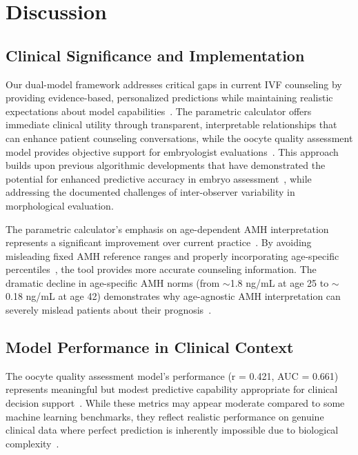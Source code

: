 \section{Discussion}\label{sec:discussion}

\subsection{Clinical Significance and Implementation}

Our dual-model framework addresses critical gaps in current IVF counseling by providing evidence-based, personalized predictions while maintaining realistic expectations about model capabilities~\cite{gameiro2023understanding,asrm2021counselors}. The parametric calculator offers immediate clinical utility through transparent, interpretable relationships that can enhance patient counseling conversations, while the oocyte quality assessment model provides objective support for embryologist evaluations~\cite{paternot2009observer,paternot2011multicentre,fordham2022embryologist}. This approach builds upon previous algorithmic developments that have demonstrated the potential for enhanced predictive accuracy in embryo assessment~\cite{rave2024bonna}, while addressing the documented challenges of inter-observer variability in morphological evaluation.

The parametric calculator's emphasis on age-dependent AMH interpretation represents a significant improvement over current practice~\cite{ovarian_reserve_testing}. By avoiding misleading fixed AMH reference ranges and properly incorporating age-specific percentiles~\cite{lee2017amh,song2021amh}, the tool provides more accurate counseling information. The dramatic decline in age-specific AMH norms (from $\sim$1.8 ng/mL at age 25 to $\sim$0.18 ng/mL at age 42) demonstrates why age-agnostic AMH interpretation can severely mislead patients about their prognosis~\cite{lee2017amh}.

\subsection{Model Performance in Clinical Context}

The oocyte quality assessment model's performance (r = 0.421, AUC = 0.661) represents meaningful but modest predictive capability appropriate for clinical decision support~\cite{varoquaux2022machine,rajkomar2019machine}. While these metrics may appear moderate compared to some machine learning benchmarks, they reflect realistic performance on genuine clinical data where perfect prediction is inherently impossible due to biological complexity~\cite{litjens2017survey}.


